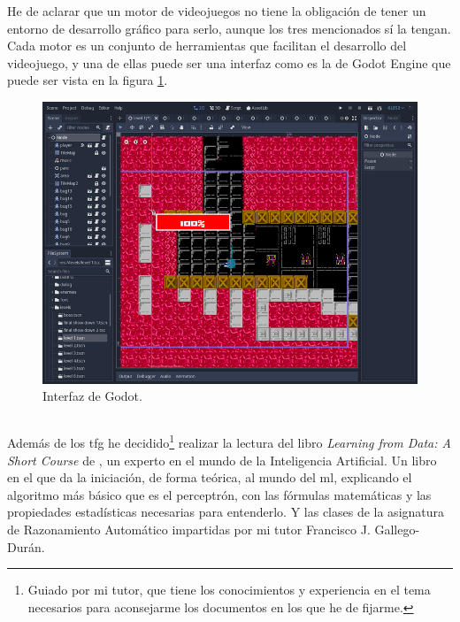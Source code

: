 He de aclarar que un motor de videojuegos no tiene la obligación de tener un entorno de desarrollo gráfico para serlo, aunque los tres mencionados sí la tengan. Cada motor es un conjunto de herramientas que facilitan el desarrollo del videojuego, y una de ellas puede ser una interfaz como es la de Godot Engine que puede ser vista en la figura \ref{Godot interfaz}. 
\begin{figure}[H]
	\centering
	\includegraphics[width=13cm]{archivos/imagenes/Godot-captura.png}
	\caption[Interfaz de Godot.]{Interfaz de Godot\footnotemark.}
	\label{Godot interfaz}
\end{figure}

\subsection{}
Además de los \gls{tfg} he decidido\footnote{Guiado por mi tutor, que tiene los conocimientos y experiencia en el tema necesarios para aconsejarme los documentos en los que he de fijarme.} realizar la lectura del libro \textit{Learning from Data: A Short Course} de , un experto en el mundo de la Inteligencia Artificial. Un libro en el que da la iniciación, de forma teórica, al mundo del \gls{ml}, explicando el algoritmo más básico que es el perceptrón, con las fórmulas matemáticas y las propiedades estadísticas necesarias para entenderlo. Y las clases de la asignatura de Razonamiento Automático impartidas por mi tutor Francisco J. Gallego-Durán.

